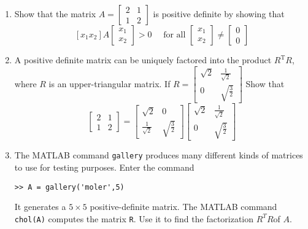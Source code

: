 \documentclass[../main.tex]{subfiles}
\begin{document}
\begin{enumerate}[label=\textbf{2.\arabic*}]
	\begin{enumerate}[label=\textbf{\alph*.}]
	\item Show that the matrix $A=\left[\begin{array}{ll}2 & 1 \\ 1 & 2\end{array}\right]$ is positive definite by showing that
	$$
	\left[x_{1} x_{2}\right] A\left[\begin{array}{l}
	x_{1} \\
	x_{2}
	\end{array}\right]>0 \quad \text { for all }\left[\begin{array}{l}
	x_{1} \\
	x_{2}
	\end{array}\right] \neq\left[\begin{array}{l}
	0 \\
	0
	\end{array}\right]
	$$
	\item  A positive definite matrix can be uniquely factored into the product $R^{\mathrm{T}} R$, where $R$ is an upper-triangular matrix. If $R=\left[\begin{array}{cc}\sqrt{2} & \frac{1}{\sqrt{2}} \\ 0 & \sqrt{\frac{3}{2}}\end{array}\right]$ Show that
$$
\left[\begin{array}{ll}
2 & 1 \\
1 & 2
\end{array}\right]=\left[\begin{array}{cc}
\sqrt{2} & 0 \\
\frac{1}{\sqrt{2}} & \sqrt{\frac{3}{2}}
\end{array}\right]\left[\begin{array}{cc}
\sqrt{2} & \frac{1}{\sqrt{2}} \\
0 & \sqrt{\frac{3}{2}}
\end{array}\right]
$$

	\item The MATLAB command \texttt{gallery} produces many different kinds of matrices to use for testing purposes. Enter
	the command
		\begin{lstlisting}[numbers=none,frame=none]
		>> A = gallery('moler',5)
		\end{lstlisting}
	It generates a $5 \times  5$ positive-definite matrix. The MATLAB command \texttt{chol(A)} computes the matrix \texttt{R}. Use it to
	find the factorization $R^{T}R $of $A$.
\end{enumerate}


\end{enumerate}
\end{document}
